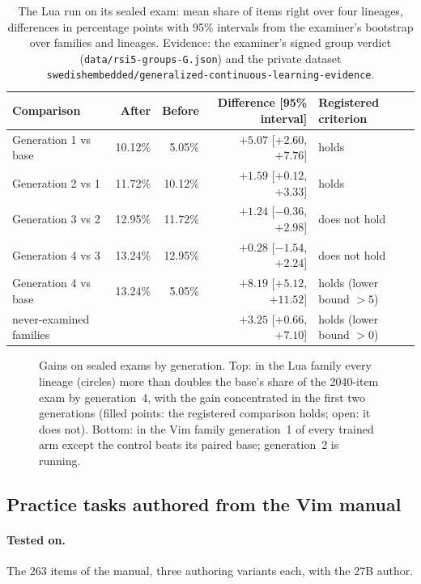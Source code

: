 \begin{table}[htbp]
\centering\small
\begin{tabular}{lrrrl}
\toprule
Comparison & After & Before & Difference [95\% interval] & Registered criterion \\
\midrule
Generation 1 vs base & 10.12\% & 5.05\% & $+5.07$ [$+2.60$, $+7.76$] & holds \\
Generation 2 vs 1 & 11.72\% & 10.12\% & $+1.59$ [$+0.12$, $+3.33$] & holds \\
Generation 3 vs 2 & 12.95\% & 11.72\% & $+1.24$ [$-0.36$, $+2.98$] & does not hold \\
Generation 4 vs 3 & 13.24\% & 12.95\% & $+0.28$ [$-1.54$, $+2.24$] & does not hold \\
\midrule
Generation 4 vs base & 13.24\% & 5.05\% & $+8.19$ [$+5.12$, $+11.52$] & holds (lower bound $> 5$) \\
\quad never-examined families & & & $+3.25$ [$+0.66$, $+7.10$] & holds (lower bound $> 0$) \\
\bottomrule
\end{tabular}
\caption{The Lua run on its sealed exam: mean share of items right over four lineages, differences in percentage points with
95\% intervals from the examiner's bootstrap over families and lineages. Evidence: the examiner's signed group verdict
(\texttt{data/rsi5-groups-G.json}) and the private dataset \nolinkurl{swedishembedded/generalized-continuous-learning-evidence}.}
\label{tab:lua}
\end{table}

\begin{figure}[htbp]
\centering

\caption{Gains on sealed exams by generation. Top: in the Lua family every lineage (circles) more than doubles the base's
share of the 2040-item exam by generation~4, with the gain concentrated in the first two generations (filled points: the
registered comparison holds; open: it does not). Bottom: in the Vim family generation~1 of every trained arm except the control
beats its paired base; generation~2 is running.}\label{fig:generations}
\end{figure}

\subsection{Practice tasks authored from the Vim manual}\label{sec:r-authoring}

\paragraph{Tested on.} The 263 items of the manual, three authoring variants each, with the 27B author.

